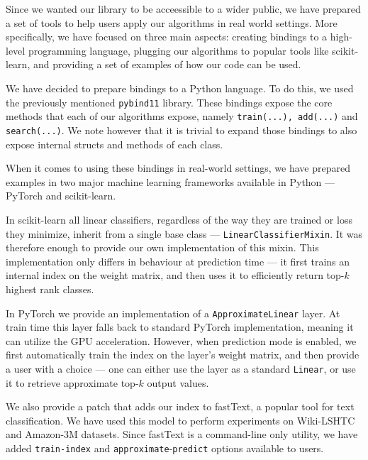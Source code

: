 Since we wanted our library to be acceessible to a wider public, we have prepared
a set of tools to help users apply our algorithms in real world settings. More specifically,
we have focused on three main aspects: creating bindings to a high-level programming language,
plugging our algorithms to popular tools like scikit-learn, and providing a set
of examples of how our code can be used.

We have decided to prepare bindings to a Python language. To do this, we used
the previously mentioned \texttt{pybind11} library. These bindings expose the core methods that
each of our algorithms expose, namely \texttt{train(...), add(...)} and \texttt{search(...)}.
We note however that it is trivial to expand those bindings to also expose internal
structs and methods of each class.

When it comes to using these bindings in real-world settings, we have prepared examples
in two major machine learning frameworks available in Python --- PyTorch
and scikit-learn.

In scikit-learn all linear classifiers, regardless of the way they are trained
or loss they minimize, inherit from a single base class --- \texttt{LinearClassifierMixin}.
It was therefore enough to provide our own implementation of this mixin. This implementation
only differs in behaviour at prediction time --- it first trains an internal index on the
weight matrix, and then uses it to efficiently return top-$k$ highest rank classes.

In PyTorch we provide an implementation of a \texttt{ApproximateLinear} layer.
At train time this layer falls back to standard PyTorch implementation, meaning
it can utilize the GPU acceleration. However, when prediction mode is enabled, we first
automatically train the index on the layer's weight matrix, and then provide a user with
a choice --- one can either use the layer as a standard \texttt{Linear}, or use it
to retrieve approximate top-$k$ output values.

We also provide a patch that adds our index to fastText, a popular tool for text classification.
We have used this model to perform experiments on Wiki-LSHTC and Amazon-3M datasets.
Since fastText is a command-line only utility, we have added \texttt{train-index}
and \texttt{approximate}-\texttt{predict} options available to users.
